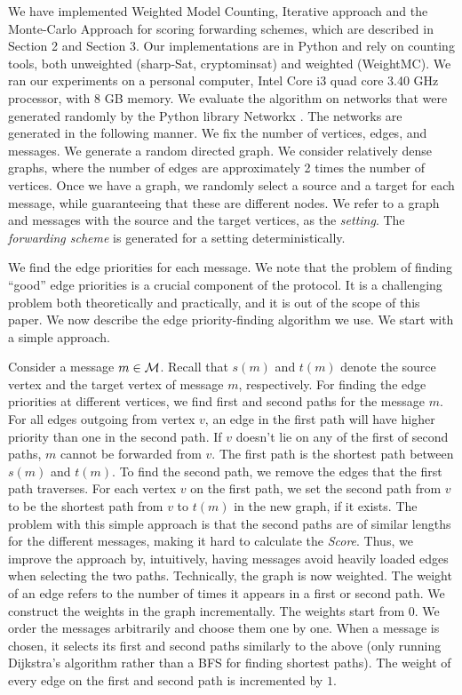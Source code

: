 \documentclass{sig-alternate}[9pt]
\newcommand{\M}{{\cal M}}
\theoremstyle{definition}
\begin{document}
	We have implemented Weighted Model Counting, Iterative approach and the Monte-Carlo Approach for scoring forwarding schemes, which are described in Section 2 and Section 3. Our implementations are in Python and rely on counting tools, both unweighted (sharp-Sat, cryptominsat) and weighted (WeightMC). We ran our experiments on a personal computer, Intel Core i3 quad core 3.40 GHz processor, with 8 GB memory.
		We evaluate the algorithm on networks that were generated randomly by the Python library Networkx
		 \cite{HSS08}.
		The networks are generated in the following manner.
		We fix the number of vertices, edges, and messages.
		We generate a random directed graph.
		We consider relatively dense graphs, where the number of edges are approximately 2 times the number of vertices.
		Once we have a graph, we randomly select a source and a target for each message,
		while guaranteeing that these are different nodes.
		We refer to a graph and messages with the source and the target vertices, 
		as the {\em setting}.
		The {\em forwarding scheme} is generated for a setting deterministically.

		We find the edge priorities for each message. We note that the problem of finding ``good'' edge priorities is a crucial component of the protocol. It is a challenging problem both theoretically and practically, and it is out of the scope of this paper. We now describe the edge priority-finding algorithm we use. We start with a simple approach.

		Consider a message $m \in \M$. Recall that $s(m)$ and $t(m)$ denote the source vertex
		and the target vertex of message $m$, respectively. For finding the edge priorities at different vertices, we find first and second paths for the message $m$. For all edges outgoing from vertex $v$, an edge in the first path will have higher priority than one in the second path. If $v$ doesn't  lie on any of the first of second paths, $m$ cannot be forwarded from $v$.
		The first path is the shortest path between $s(m)$ and $t(m)$.
		To find the second path, we remove the edges that the first path traverses.
		For each vertex $v$ on the first path,
		we set the second path from $v$ to be the shortest path from $v$ to $t(m)$ in the new graph, if it exists. 
		The problem with this simple approach is that the second paths are of similar lengths for the different messages, making it hard to calculate the {\em Score}. Thus, we improve the approach by, intuitively, having messages avoid heavily loaded edges when selecting the two paths. Technically, the graph is now weighted. The weight of  an edge refers to the number of times it appears in a first or second path. We construct the weights in the graph incrementally. The weights start from $0$. We order the messages arbitrarily and choose them one by one. When a message is chosen, it selects its first and second paths similarly to the above (only running Dijkstra's algorithm rather than a BFS for finding shortest paths). The weight of every edge on the first and second path is incremented by $1$.
\end{document}
